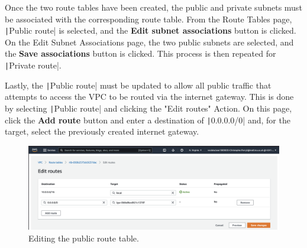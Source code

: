 
\clearpage
Once the two route tables have been created, the public and private subnets must be associated with the corresponding
route table.
From the Route Tables page, \texttt|Public route| is selected, and the \textbf{Edit subnet associations} button
is clicked.
On the Edit Subnet Associations page, the two public subnets are selected, and the \textbf{Save associations} button is
clicked.
This process is then repeated for \texttt|Private route|.


\clearpage
Lastly, the \texttt|Public route| must be updated to allow all public traffic that attempts to access the VPC
to be routed via the internet gateway.
This is done by selecting \texttt|Public route| and clicking the "Edit routes" Action.
On this page, click the \textbf{Add route} button and enter a destination of \texttt|0.0.0.0/0| and, for the target,
select the previously created internet gateway.

\begin{figure}[!htbp]
    \centering
    \includegraphics[width=150mm]{resources/vpc/routes/vpc-public-route-table}
    \caption{Editing the public route table.}
    \label{fig:vpc-public-route-table}
\end{figure}

